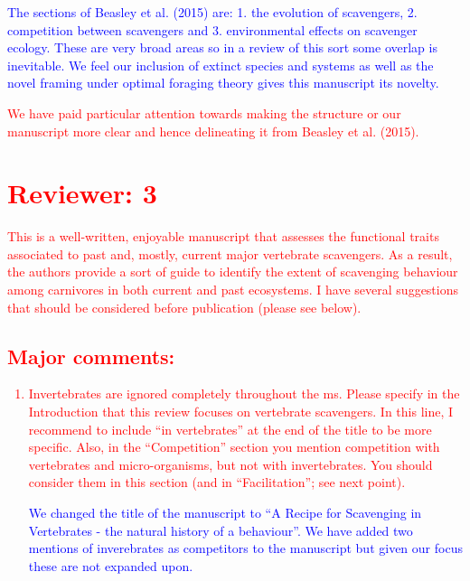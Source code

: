 \documentclass[12pt,letterpaper]{article}
\begin{document}
\textcolor{blue}{The sections of Beasley et al. (2015) are: 1. the evolution of scavengers, 2. competition between scavengers and 3. environmental effects on scavenger ecology.
These are very broad areas so in a review of this sort some overlap is inevitable.
We feel our inclusion of extinct species and systems as well as the novel framing under optimal foraging theory gives this manuscript its novelty.} \textcolor{red}{We have paid particular attention towards making the structure or our manuscript more clear and hence delineating it from Beasley et al. (2015).
\bigskip

\section{Reviewer: 3}
This is a well-written, enjoyable manuscript that assesses the functional traits associated to past and, mostly, current major vertebrate scavengers.
As a result, the authors provide a sort of guide to identify the extent of scavenging behaviour among carnivores in both current and past ecosystems.
I have several suggestions that should be considered before publication (please see below).

\subsection{Major comments:}

\begin{enumerate}
\item{Invertebrates are ignored completely throughout the ms.
Please specify in the Introduction that this review focuses on vertebrate scavengers.
In this line, I recommend to include ``in vertebrates'' at the end of the title to be more specific.
Also, in the ``Competition'' section you mention competition with vertebrates and micro-organisms, but not with invertebrates.
You should consider them in this section (and in ``Facilitation''; see next point).}

\textcolor{blue}{We changed the title of the manuscript to ``A Recipe for Scavenging in Vertebrates - the natural history of a behaviour''. We have added two mentions of inverebrates as competitors to the manuscript but given our focus these are not expanded upon.}


\end{enumerate}}
\end{document}
